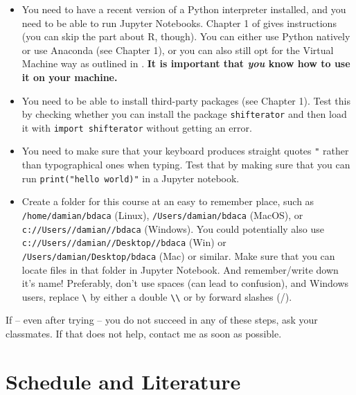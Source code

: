 \documentclass[a4paper,10pt,twocolumn]{report}
\newenvironment{corona}{%
	\begin{shaded*}%
	}{%
	\end{shaded*}%
}
\begin{document}
\begin{corona}
\begin{itemize}
	\item You need to have a recent version of a Python interpreter installed, and you need to be able to run Jupyter Notebooks. Chapter 1 of \cite{cssbook} gives instructions (you can skip the part about R, though). You can either use Python natively or use Anaconda (see Chapter 1), or you can also still opt for the Virtual Machine way as outlined in \cite{Trilling2016}. \textbf{It is important that \emph{you} know how to use it on your machine.}
	\item You need to be able to install third-party packages (see Chapter 1). Test this by checking whether you can install the package \texttt{shifterator} and then load it with \texttt{import shifterator} without getting an error.
	\item You need to make sure that your keyboard produces straight quotes \texttt{"} rather than typographical ones when typing. Test that by making sure that you can run \texttt{print("hello world)"} in a Jupyter notebook.
	\item Create a folder for this course at an easy to remember place, such as \texttt{/home/damian/bdaca} (Linux), \texttt{/Users/damian/bdaca} (MacOS), or \texttt{c://Users//damian//bdaca} (Windows). You could potentially also use \texttt{c://Users//damian//Desktop//bdaca} (Win) or \texttt{/Users/damian/Desktop/bdaca} (Mac) or similar. Make sure that you can locate files in that folder in Jupyter Notebook. And remember/write down it's name! Preferably, don't use spaces (can lead to confusion), and Windows users, replace \texttt{\textbackslash} by either a double \texttt{\textbackslash \textbackslash} or by forward slashes (/).
\end{itemize}
If -- even after trying -- you do not succeed in any of these steps, ask your classmates. If that does not help, contact me as soon as possible. 
\end{corona}




\chapter{Schedule and Literature}







\end{document}
